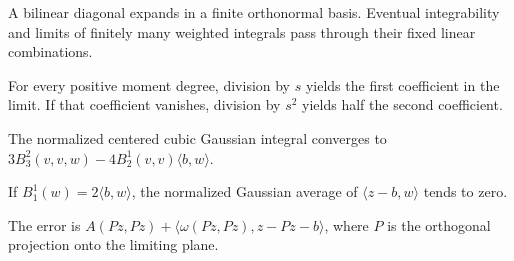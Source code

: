 \begin{lemma}
\label{lem:finite-bilinear-integral-limits}

A bilinear diagonal expands in a finite orthonormal basis. Eventual integrability and limits of finitely many weighted integrals pass through their fixed linear combinations.
\end{lemma}

\begin{lemma}
\label{lem:low-order-moment-limits}

For every positive moment degree, division by $s$ yields the first coefficient in the limit. If that coefficient vanishes, division by $s^2$ yields half the second coefficient.
\end{lemma}

\begin{lemma}
\label{lem:mixed-centered-gaussian-limit}

The normalized centered cubic Gaussian integral converges to $3B_3^2(v,v,w)-4B_2^1(v,v)\langle b,w\rangle$.
\end{lemma}

\begin{lemma}
\label{lem:centered-gaussian-mean-limit}

If $B_1^1(w)=2\langle b,w\rangle$, the normalized Gaussian average of $\langle z-b,w\rangle$ tends to zero.
\end{lemma}

\begin{definition}
\label{def:rigidity-error}

The error is $A(Pz,Pz)+\langle\omega(Pz,Pz),z-Pz-b\rangle$, where $P$ is the orthogonal projection onto the limiting plane.
\end{definition}

